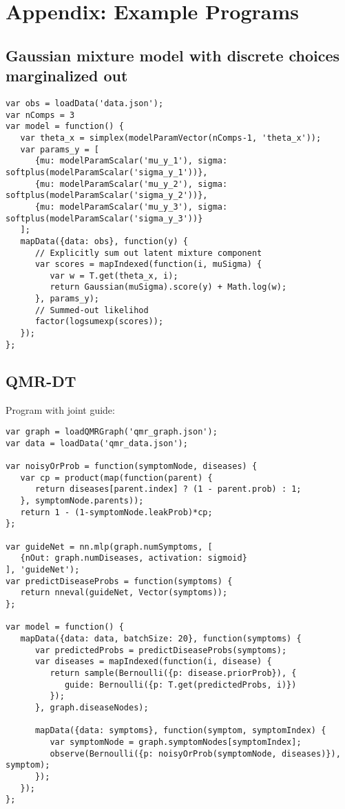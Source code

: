 \section{Appendix: Example Programs}
\label{sec:appendix_code}

\subsection{Gaussian mixture model with discrete choices marginalized out}
\label{sec:appendix_code:gmmSumOut}

\begin{lstlisting}
var obs = loadData('data.json');
var nComps = 3
var model = function() {
   var theta_x = simplex(modelParamVector(nComps-1, 'theta_x'));
   var params_y = [
      {mu: modelParamScalar('mu_y_1'), sigma: softplus(modelParamScalar('sigma_y_1'))},
      {mu: modelParamScalar('mu_y_2'), sigma: softplus(modelParamScalar('sigma_y_2'))},
      {mu: modelParamScalar('mu_y_3'), sigma: softplus(modelParamScalar('sigma_y_3'))}
   ];
   mapData({data: obs}, function(y) {
      // Explicitly sum out latent mixture component
      var scores = mapIndexed(function(i, muSigma) {
         var w = T.get(theta_x, i);
         return Gaussian(muSigma).score(y) + Math.log(w);
      }, params_y);
      // Summed-out likelihod
      factor(logsumexp(scores));
   });
};
\end{lstlisting}

\subsection{QMR-DT}
\label{sec:appendix_code:qmr}

Program with joint guide:
\begin{lstlisting}
var graph = loadQMRGraph('qmr_graph.json');
var data = loadData('qmr_data.json');

var noisyOrProb = function(symptomNode, diseases) {
   var cp = product(map(function(parent) {
      return diseases[parent.index] ? (1 - parent.prob) : 1;
   }, symptomNode.parents));
   return 1 - (1-symptomNode.leakProb)*cp;
};

var guideNet = nn.mlp(graph.numSymptoms, [
   {nOut: graph.numDiseases, activation: sigmoid}
], 'guideNet');
var predictDiseaseProbs = function(symptoms) {
   return nneval(guideNet, Vector(symptoms));
};

var model = function() {
   mapData({data: data, batchSize: 20}, function(symptoms) {
      var predictedProbs = predictDiseaseProbs(symptoms);
      var diseases = mapIndexed(function(i, disease) {
         return sample(Bernoulli({p: disease.priorProb}), {
            guide: Bernoulli({p: T.get(predictedProbs, i)})
         });
      }, graph.diseaseNodes);

      mapData({data: symptoms}, function(symptom, symptomIndex) {
         var symptomNode = graph.symptomNodes[symptomIndex];
         observe(Bernoulli({p: noisyOrProb(symptomNode, diseases)}), symptom);
      });
   });
};
\end{lstlisting}

